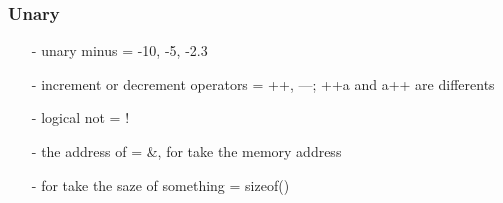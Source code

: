          \subsubsection{Unary}
            \begin{itemize}
              \item[-] unary minus = -10, -5, -2.3 
              \item[-] increment or decrement operators = ++, ---; ++a and a++ are differents
              \item[-] logical not = ! 
              \item[-] the address of = \&, for take the memory address
              \item[-] for take the saze of something = sizeof()  
            \end{itemize}


                        
        





